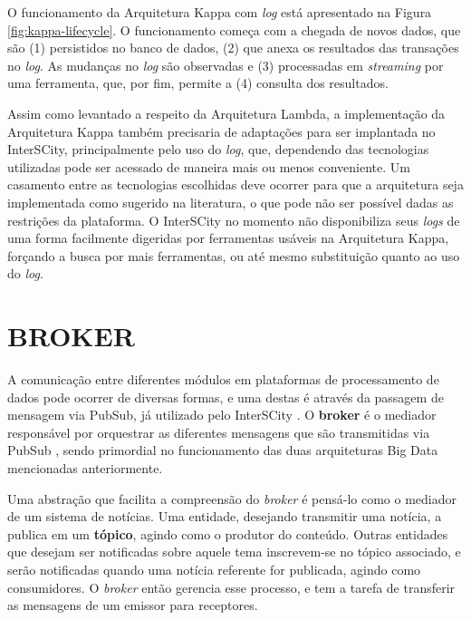 O funcionamento da Arquitetura Kappa com \textit{log} está apresentado na Figura
\ref{fig:kappa-lifecycle}. O funcionamento começa com a chegada de novos dados,
que são (1) persistidos no banco de dados, (2) que anexa os resultados das
transações no \textit{log}. As mudanças no \textit{log} são observadas e
(3) processadas em \textit{streaming} por uma ferramenta, que, por fim, permite
a (4) consulta dos resultados.

Assim como levantado a respeito da Arquitetura Lambda, a implementação da
Arquitetura Kappa também precisaria de adaptações para ser implantada no
InterSCity, principalmente pelo uso do \textit{log}, que, dependendo das
tecnologias utilizadas pode ser acessado de maneira mais ou menos conveniente.
Um casamento entre as tecnologias escolhidas deve ocorrer para que a
arquitetura seja implementada como sugerido na literatura, o que pode não ser
possível dadas as restrições da plataforma. O InterSCity no momento não
disponibiliza seus \textit{logs} de uma forma facilmente digeridas por
ferramentas usáveis na Arquitetura Kappa, forçando a busca por mais ferramentas,
ou até mesmo substituição quanto ao uso do \textit{log}.

\section{BROKER}

A comunicação entre diferentes módulos em plataformas de processamento de dados
pode ocorrer de diversas formas, e uma destas é através da passagem
de mensagem via PubSub, já utilizado pelo InterSCity \cite{delesposte2017}.
O \textbf{broker} é o mediador responsável por orquestrar as diferentes
mensagens que são transmitidas via PubSub \cite{marz2015}, sendo primordial no
funcionamento das duas arquiteturas Big Data mencionadas anteriormente.

Uma abstração que facilita a compreensão do \textit{broker} é pensá-lo como o
mediador de um sistema de notícias. Uma entidade, desejando transmitir
uma notícia, a publica em um \textbf{tópico}, agindo como o produtor do
conteúdo. Outras entidades que desejam ser notificadas sobre aquele tema
inscrevem-se no tópico associado, e serão notificadas quando uma notícia referente
for publicada, agindo como consumidores. O \textit{broker} então
gerencia esse processo, e tem a tarefa de transferir as mensagens de um
emissor para receptores.

